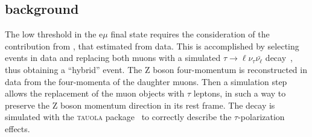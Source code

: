 \subsection{\dytt background\label{sec:DYtautaubkg}}

The low \MET threshold in the e$\mu$ final state requires the consideration of the contribution from \dytt, that estimated from data.
This is accomplished by selecting \dymm events in data and replacing both muons with a simulated
$\tau\to \ell\nu_\tau\bar{\nu_\ell}$ decay~\cite{Chatrchyan:2013iaa}, thus obtaining a ``hybrid'' event. The Z boson four-momentum is reconstructed in data from the four-momenta of the daughter muons. Then a simulation step allows the replacement of the muon objects with $\tau$ leptons, in such a way to preserve the Z boson momentum direction in its rest frame. The \dytt decay is simulated with the \textsc{tauola} package~\cite{Jadach:1990mz} to correctly describe the $\tau$-polarization effects.

